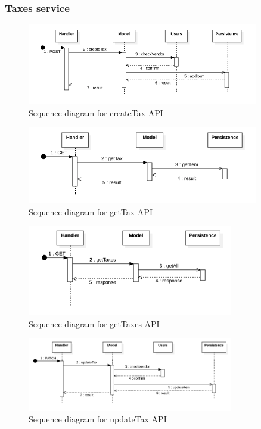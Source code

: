 \subsubsection{Taxes service}
\begin{figure}[H]
    \includegraphics[width=0.9\textwidth]{res/images/sequence-diagrams/taxes/createTax.png}
    \caption{Sequence diagram for createTax API}
\end{figure}

\begin{figure}[H]
    \includegraphics[width=0.9\textwidth]{res/images/sequence-diagrams/taxes/getTax.png}
    \caption{Sequence diagram for getTax API}
\end{figure}

\begin{figure}[H]
    \includegraphics[width=0.8\textwidth]{res/images/sequence-diagrams/taxes/getTaxes.png}
    \caption{Sequence diagram for getTaxes API}
\end{figure}

\begin{figure}[H]
    \includegraphics[width=0.8\textwidth]{res/images/sequence-diagrams/taxes/updateTax.png}
    \caption{Sequence diagram for updateTax API}
\end{figure}

